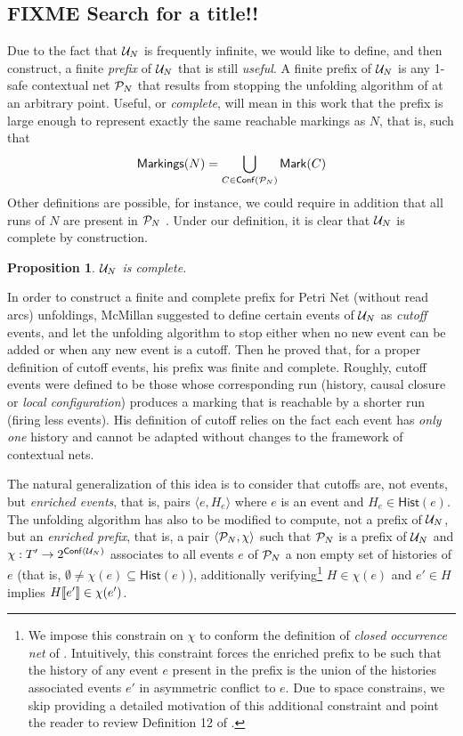 \documentclass[11pt,a4paper]{article}
\newtheorem{proposition}{Proposition}
\newcommand{\hist}[1]{\ensuremath{\mathsf{Hist}(#1)}}
\newcommand{\conf}[1]{\ensuremath{\mathsf{Conf}(#1)}}
\begin{document}
\subsection{FIXME Search for a title!!}


Due to the fact that $\mathcal{U}_{N}$ is frequently infinite, we would like to define,
and then construct, a finite \emph{prefix} of $\mathcal{U}_{N}$ that is still
\emph{useful}.  A finite prefix of $\mathcal{U}_{N}$ is any 1-safe contextual net $\mathcal{P}_{N}$ that results from stopping the unfolding algorithm of  at
an arbitrary point.  Useful, or \emph{complete}, will mean in this work that
the prefix is large enough to represent exactly the same reachable markings as
$N$, that is, such that $$\markings N = \bigcup_{C \in \conf{\pref N}}
\marking{C}$$ Other definitions are possible, for instance, we could require in
addition that all runs of $N$ are present in $\mathcal{P}_{N}$ .  Under our
definition, it is clear that $\mathcal{U}_{N}$ is complete by construction.

\begin{proposition}
$\mathcal{U}_{N}$ is complete.
\end{proposition}

In order to construct a finite and complete prefix for Petri Net (without read
arcs) unfoldings, McMillan suggested  to define certain events of
$\mathcal{U}_{N}$ as \emph{cutoff} events, and let the unfolding algorithm to stop
either when no new event can be added or when any new event is a cutoff.  Then
he proved that, for a proper definition of cutoff events, his prefix was finite
and complete.  Roughly, cutoff events were defined to be those whose
corresponding run (history, causal closure or \emph{local configuration})
produces a marking that is reachable by a shorter run (firing less events).
His definition of cutoff relies on the fact each event has \emph{only one}
history and cannot be adapted without changes to the framework of contextual
nets.

The natural generalization of this idea is to consider that cutoffs are, not
events, but \emph{enriched events}, that is, pairs $\langle e, H_e \rangle$
where $e$ is an event and $H_e \in \hist e$.  The unfolding algorithm has also
to be modified to compute, not a prefix of $\mathcal{U}_{N}$, but an \emph{enriched
prefix}, that is, a pair $\langle \mathcal{P}_{N}, \chi \rangle$ such that $\mathcal{P}_{N}$ is
a prefix of $\mathcal{U}_{N}$ and $\chi : T' \to 2^{\conf{\unf N}}$ associates to all
events $e$ of $\mathcal{P}_{N}$ a non empty set of histories of $e$ (that is,
$\emptyset \not = \chi(e) \subseteq \hist{e}$), additionally
verifying\footnote{We impose this constrain on $\chi$ to conform the definition
of \emph{closed occurrence net} of .  Intuitively, this
constraint forces the enriched prefix to be such that the history of any event
$e$ present in the prefix is the union of the histories associated events $e'$
in asymmetric conflict to $e$.  Due to space constrains, we skip providing a
detailed motivation of this additional constraint and point the reader to
review Definition 12 of .} $H \in \chi (e)$ and $e' \in H$
implies $H [\![ e']\!] \in \chi (e')$.
\end{document}
